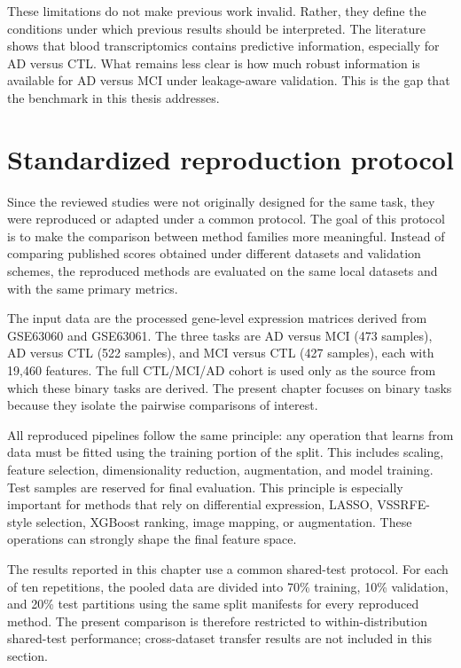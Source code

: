 These limitations do not make previous work invalid. Rather, they define the conditions under which previous results should be interpreted. The literature shows that blood transcriptomics contains predictive information, especially for AD versus CTL. What remains less clear is how much robust information is available for AD versus MCI under leakage-aware validation. This is the gap that the benchmark in this thesis addresses.

\section{Standardized reproduction protocol}
\label{sec:reproduction-protocol}

Since the reviewed studies were not originally designed for the same task, they were reproduced or adapted under a common protocol. The goal of this protocol is to make the comparison between method families more meaningful. Instead of comparing published scores obtained under different datasets and validation schemes, the reproduced methods are evaluated on the same local datasets and with the same primary metrics.

The input data are the processed gene-level expression matrices derived from GSE63060 and GSE63061. The three tasks are AD versus MCI (473 samples), AD versus CTL (522 samples), and MCI versus CTL (427 samples), each with 19,460 features. The full CTL/MCI/AD cohort is used only as the source from which these binary tasks are derived. The present chapter focuses on binary tasks because they isolate the pairwise comparisons of interest.

All reproduced pipelines follow the same principle: any operation that learns from data must be fitted using the training portion of the split. This includes scaling, feature selection, dimensionality reduction, augmentation, and model training. Test samples are reserved for final evaluation. This principle is especially important for methods that rely on differential expression, LASSO, VSSRFE-style selection, XGBoost ranking, image mapping, or augmentation. These operations can strongly shape the final feature space.

The results reported in this chapter use a common shared-test protocol. For each of ten repetitions, the pooled data are divided into 70\% training, 10\% validation, and 20\% test partitions using the same split manifests for every reproduced method. The present comparison is therefore restricted to within-distribution shared-test performance; cross-dataset transfer results are not included in this section.

